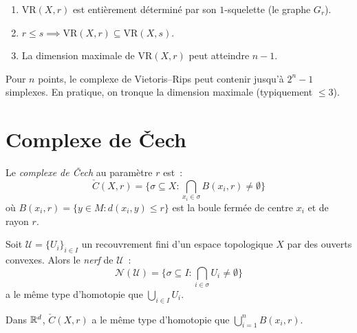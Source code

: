 \begin{proposition}[Propri\'et\'es]
\begin{enumerate}
  \item $\mathrm{VR}(X, r)$ est enti\`erement d\'etermin\'e par son
        $1$-squelette (le graphe $G_r$).
  \item $r \leq s \implies \mathrm{VR}(X, r) \subseteq \mathrm{VR}(X, s)$.
  \item La dimension maximale de $\mathrm{VR}(X, r)$ peut atteindre
        $n - 1$.
\end{enumerate}
\end{proposition}

\begin{attention}[title=\textbf{Explosion combinatoire}]
Pour $n$ points, le complexe de Vietoris--Rips peut contenir
jusqu'\`a $2^n - 1$ simplexes. En pratique, on tronque la dimension
maximale (typiquement $\leq 3$).
\end{attention}

\section{Complexe de \v{C}ech}

\begin{definition}
Le \emph{complexe de \v{C}ech} au param\`etre $r$ est~:
\[
  \check{C}(X, r) = \big\{
    \sigma \subseteq X : \bigcap_{x_i \in \sigma} B(x_i, r) \neq \emptyset
  \big\}
\]
o\`u $B(x_i, r) = \{y \in M : d(x_i, y) \leq r\}$ est la boule
ferm\'ee de centre $x_i$ et de rayon $r$.
\end{definition}

\begin{theoreme}
Soit $\mathcal{U} = \{U_i\}_{i \in I}$ un recouvrement fini d'un
espace topologique $X$ par des ouverts convexes. Alors le \emph{nerf}
de $\mathcal{U}$~:
\[
  \mathcal{N}(\mathcal{U}) = \big\{
    \sigma \subseteq I : \bigcap_{i \in \sigma} U_i \neq \emptyset
  \big\}
\]
a le m\^eme type d'homotopie que $\bigcup_{i \in I} U_i$.
\end{theoreme}

\begin{corollaire}
Dans $\mathbb{R}^d$, $\check{C}(X, r)$ a le m\^eme type d'homotopie que
$\bigcup_{i=1}^n B(x_i, r)$.
\end{corollaire}

